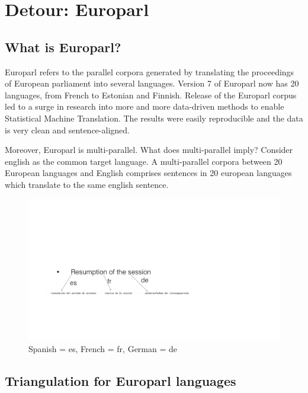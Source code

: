 
%
%

\chapter{Detour: Europarl}
\label{chap:europarl}

\section{What is Europarl?}
Europarl refers to the parallel corpora generated by translating the proceedings of European parliament into several languages. Version 7 of Europarl now has 20 languages, from French to Estonian and Finnish. Release of the Europarl corpus led to a surge in research into more and more data-driven methods to enable Statistical Machine Translation. The results were easily reproducible and the data is very clean and sentence-aligned. 

Moreover, Europarl is multi-parallel. What does multi-parallel imply? Consider english as the common target language. A multi-parallel corpora between 20 European languages and English comprises sentences in 20 european languages which translate to the same english sentence. 

\begin{figure}
	\includegraphics[scale=0.4]{files/Figures/eparl_multiparallel.jpg}
	\caption{Spanish = es, French = fr, German = de}
	\label{fig:eparl_multi}
\end{figure}


\section{Triangulation for Europarl languages}



